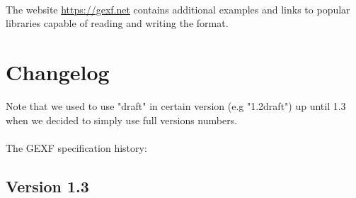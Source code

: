 \documentclass[a4paper,10pt]{article}
\begin{document}
\paragraph{}
The website \href{https://gexf.net}{https://gexf.net} contains additional examples and links to popular libraries capable of reading and writing the format.

\section{Changelog} \label{changelog}

Note that we used to use "draft" in certain version (e.g "1.2draft") up until 1.3 when we decided to simply use full versions numbers.

\paragraph{}
The GEXF specification history:

\subsection*{Version 1.3}
\end{document}
